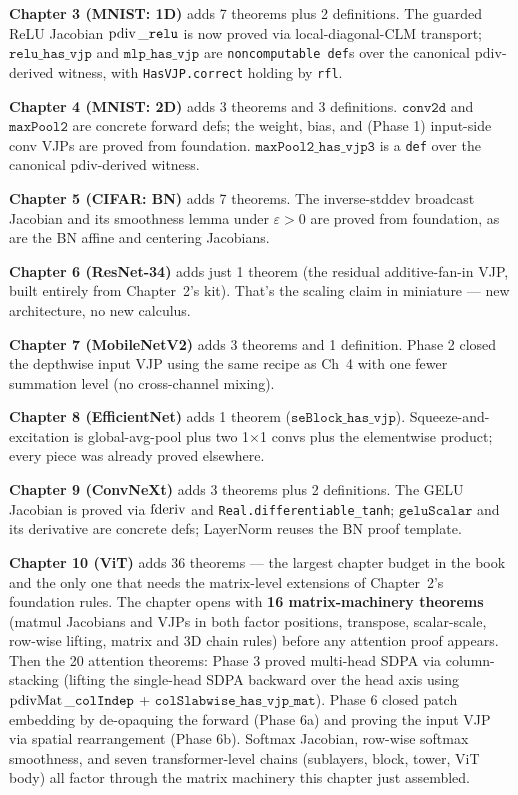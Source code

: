 \textbf{Chapter 3 (MNIST: 1D)} adds 7 theorems plus 2 definitions.
The guarded ReLU Jacobian \(\operatorname{pdiv}\_\texttt{relu}\) is now proved
via local-diagonal-CLM transport; \(\texttt{relu\_has\_vjp}\)
and \(\texttt{mlp\_has\_vjp}\) are \texttt{noncomputable def}s
over the canonical pdiv-derived witness, with
\texttt{HasVJP.correct} holding by \texttt{rfl}.

\textbf{Chapter 4 (MNIST: 2D)} adds 3 theorems and 3 definitions.
\(\texttt{conv2d}\) and \(\texttt{maxPool2}\) are concrete
forward defs; the weight, bias, and (Phase 1) input-side conv
VJPs are proved from foundation.
\(\texttt{maxPool2\_has\_vjp3}\) is a \texttt{def} over the
canonical pdiv-derived witness.

\textbf{Chapter 5 (CIFAR: BN)} adds 7 theorems. The inverse-stddev
broadcast Jacobian and its smoothness lemma under
\(\varepsilon > 0\) are proved from foundation, as are the
BN affine and centering Jacobians.

\textbf{Chapter 6 (ResNet-34)} adds just 1 theorem (the
residual additive-fan-in VJP, built entirely from Chapter~2's
kit). That's the scaling claim in miniature --- new
architecture, no new calculus.

\textbf{Chapter 7 (MobileNetV2)} adds 3 theorems and 1 definition.
Phase 2 closed the depthwise input VJP using the same recipe
as Ch~4 with one fewer summation level (no cross-channel mixing).

\textbf{Chapter 8 (EfficientNet)} adds 1 theorem
(\(\texttt{seBlock\_has\_vjp}\)). Squeeze-and-excitation is
global-avg-pool plus two 1\(\times\)1 convs plus the elementwise
product; every piece was already proved elsewhere.

\textbf{Chapter 9 (ConvNeXt)} adds 3 theorems plus 2 definitions.
The GELU Jacobian is proved via \(\operatorname{fderiv}\) and
\texttt{Real.differentiable\_tanh}; \(\texttt{geluScalar}\) and
its derivative are concrete defs; LayerNorm reuses the BN
proof template.

\textbf{Chapter 10 (ViT)} adds 36 theorems --- the largest chapter
budget in the book and the only one that needs the matrix-level
extensions of Chapter~2's foundation rules. The chapter opens with
\textbf{16 matrix-machinery theorems} (matmul Jacobians and VJPs in
both factor positions, transpose, scalar-scale, row-wise lifting,
matrix and 3D chain rules) before any attention proof appears.
Then the 20 attention theorems: Phase 3 proved multi-head SDPA via
column-stacking (lifting the single-head SDPA backward over the
head axis using \(\operatorname{pdivMat}\_\texttt{colIndep}\) +
\(\texttt{colSlabwise\_has\_vjp\_mat}\)). Phase 6 closed patch
embedding by de-opaquing the forward (Phase 6a) and proving the
input VJP via spatial rearrangement (Phase 6b). Softmax Jacobian,
row-wise softmax smoothness, and seven transformer-level chains
(sublayers, block, tower, ViT body) all factor through the matrix
machinery this chapter just assembled.

